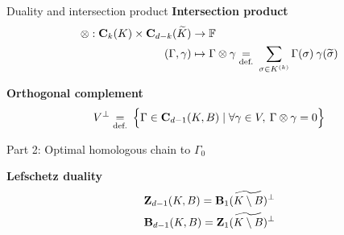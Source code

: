 \begin{frame}{Duality and intersection product}
	\textbf{Intersection product}
	\begin{align*}
		\begin{split}
			\otimes : \mathbf{C}_k(K) \times  \mathbf{C}_{d-k}(\widetilde{K}) &\to \mathbb{F}\\
			(\Gamma, \gamma) &\mapsto \Gamma \otimes \gamma \underset{\text{def.}}{=} \: \sum_{\sigma \in K^{(k)}} \Gamma(\sigma) \: \gamma (\widetilde{\sigma})
		\end{split}
	\end{align*}
	
	\textbf{Orthogonal complement}	
	\begin{equation}
		V^{\perp} \underset{\text{def.}}{=} \: \Big\{ \Gamma \in\mathbf{C}_{d-1}(K, B) \mid \forall \gamma \in V, \: \Gamma \otimes \gamma = 0 \Big\}
	\end{equation}
\end{frame}

\begin{frame}{Part 2: Optimal homologous chain to $\Gamma_0$}
	
	\textbf{Lefschetz duality}	
	\begin{eqnarray*}
		\mathbf{Z}_{d-1}(K, B) = \mathbf{B}_1(\widetilde{K \setminus B})^{\perp} \\
		\mathbf{B}_{d-1}(K, B) = \mathbf{Z}_1(\widetilde{K \setminus B})^{\perp} 
	\end{eqnarray*}
	
	\vspace{0.2cm}	
	\pause

	\begin{center}
	\end{center}
\end{frame}


